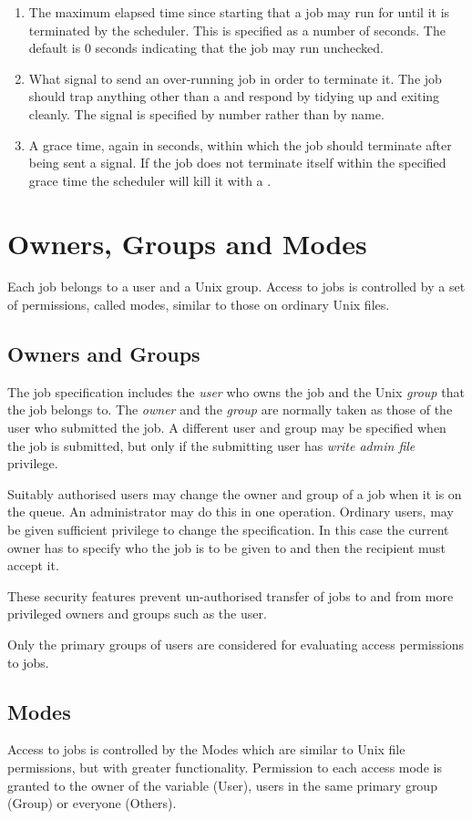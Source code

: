 \begin{enumerate}
\item The maximum elapsed time since starting that a job may run for until it is terminated by the scheduler. This is specified as a number
of seconds. The default is 0 seconds indicating that the job may run unchecked.
\item What signal to send an over-running job in order to terminate it. The job should trap anything other than a 
and respond by tidying up and exiting cleanly. The signal is specified by number rather than by name.
\item A grace time, again in seconds, within which the job should terminate after being sent a signal. If the job does not terminate
itself within the specified grace time the scheduler will kill it with a .
\end{enumerate}
\section{Owners, Groups and Modes}
Each job belongs to a user and a Unix group. Access to jobs is controlled by a set of permissions, called modes, similar to those on
ordinary Unix files.

\subsection{Owners and Groups}
The job specification includes the \textit{user} who owns the job and the Unix \textit{group} that the job belongs to. The \textit{owner} and
the \textit{group} are normally taken as those of the user who submitted the job. A different user and group may be specified when the
job is submitted, but only if the submitting user has \textit{write admin file} privilege.

Suitably authorised users may change the owner and group of a job when it is on the queue. An administrator may do this in one operation.
Ordinary users, may be given sufficient privilege to change the specification. In this case the current owner has to specify who the
job is to be given to and then the recipient must accept it.

These security features prevent un-authorised transfer of jobs to and from more privileged owners and groups such as the
 user.

Only the primary groups of users are considered for evaluating access permissions to jobs.

\subsection{Modes}
Access to jobs is controlled by the Modes which are similar to Unix file permissions, but with greater functionality. Permission to each access
mode is granted to the owner of the variable (User), users in the same primary group (Group) or everyone (Others).

